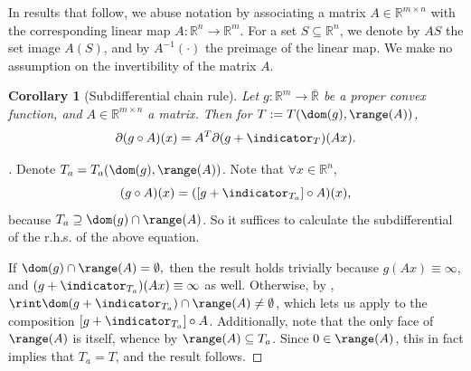 \documentclass{article}
\theoremstyle{plain}
\newtheorem{corollary}{Corollary}[section]
\theoremstyle{definition}
\theoremstyle{remark}
\begin{document}
In results that follow, we abuse notation by associating
a matrix $A \in \mathbb{R}^{m \times n}$ with the corresponding linear
map $A:\mathbb{R}^n \to \mathbb{R}^m$. For a set $S \subseteq \mathbb{R}^n$,
we denote by $AS$ the set image $A(S)$, and 
by $A^{-1}(\cdot)$ the preimage of the linear map. 
We make no assumption on the
invertibility of the matrix $A$.
\begin{corollary}[Subdifferential chain rule]
\label{loc:generalized_subdifferential_chain_rule.statement}
Let $g:\mathbb{R}^m  \to \bar{\mathbb{R}}$ be a proper convex function,
and $A \in \mathbb{R}^{m  \times n}$ a matrix.
Then for $T := T(\dom(g), \range(A))$,
\begin{equation*}
\partial(g \circ A)(x) = A^T\partial(g + \indicator_{T})(Ax).
\end{equation*}
\end{corollary}
\begin{proof}[\hypertarget{loc:generalized_subdifferential_chain_rule.proof}Proof of \Cref{loc:generalized_subdifferential_chain_rule.statement}]

Denote $T_a = T_a(\dom(g),\range(A))$.
Note that $\forall x \in \mathbb{R}^n$,
\begin{equation*}
(g\circ A)(x)= ([g + \indicator_{T_a}] \circ A)(x),
\end{equation*}
because $T_a \supseteq \dom(g) \cap \range(A)$. So it suffices to calculate the subdifferential of the r.h.s. of the above equation.

If $\dom(g)  \cap \range(A) = \emptyset,$
then the result holds trivially because $g(Ax) \equiv \infty$, and $(g + \indicator_{T_a})(Ax) \equiv \infty$ as well.
Otherwise, by , 
$\rint \dom(g + \indicator_{T_a})  \cap \range(A)  \neq \emptyset$,
which lets us apply \cite[Theorem 23.9]{rockafellarConvexAnalysis1970}
to the composition $[g + \indicator_{T_a}] \circ A$.
Additionally, note that the only face of $\range(A)$ is itself, whence by
$\range(A) \subseteq T_a$. Since $0 \in \range(A)$,
this in fact implies that $T_a = T$, and the result follows.
\end{proof}
\end{document}

